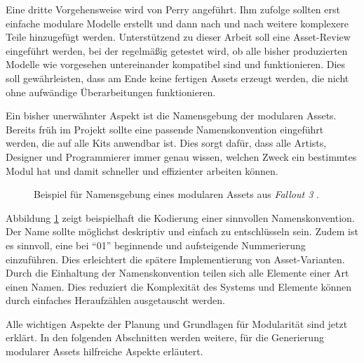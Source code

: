 \par
Eine dritte Vorgehensweise wird von Perry angeführt. Ihm zufolge sollten erst einfache modulare Modelle erstellt und dann nach und nach weitere komplexere Teile hinzugefügt werden. Unterstützend zu dieser Arbeit soll eine Asset-Review eingeführt werden, bei der regelmäßig getestet wird, ob alle bisher produzierten Modelle wie vorgesehen untereinander kompatibel sind und funktionieren. Dies soll gewährleisten, dass am Ende keine fertigen Assets erzeugt werden, die nicht ohne aufwändige Überarbeitungen funktionieren. \parencite{Perry}
\par
Ein bisher unerwähnter Aspekt ist die Namensgebung der modularen Assets. Bereits früh im Projekt sollte eine passende Namenskonvention eingeführt werden, die auf alle Kits anwendbar ist. Dies sorgt dafür, dass alle Artists, Designer und Programmierer immer genau wissen, welchen Zweck ein bestimmtes Modul hat und damit schneller und effizienter arbeiten können. \parencite{Burgess}

\begin{figure}[!h]
\centering
  \caption{Beispiel für Namensgebung eines modularen Assets aus \textit{Fallout 3} \parencite{Burgess}.}
	\label{namingConvention}
\end{figure}
Abbildung \ref{namingConvention} zeigt beispielhaft die Kodierung einer sinnvollen Namenskonvention. Der Name sollte möglichst deskriptiv und einfach zu entschlüsseln sein. Zudem ist es sinnvoll, eine bei \enquote{01} beginnende und aufsteigende Nummerierung einzuführen. Dies erleichtert die spätere Implementierung von Asset-Varianten. Durch die Einhaltung der Namenskonvention teilen sich alle Elemente einer Art einen Namen. Dies reduziert die Komplexität des Systems und Elemente können durch einfaches Heraufzählen ausgetauscht werden. \parencite{Burgess}
\par
Alle wichtigen Aspekte der Planung und Grundlagen für Modularität sind jetzt erklärt. In den folgenden Abschnitten werden weitere, für die Generierung modularer Assets hilfreiche Aspekte erläutert. 
